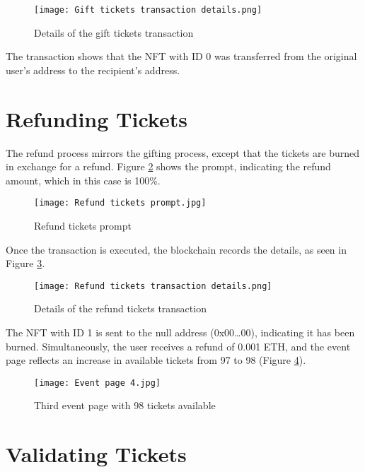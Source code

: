 \begin{figure}[H]
    \texttt{[image: Gift tickets transaction details.png]}
    \centering
    \caption{Details of the gift tickets transaction}
    \label{fig:gift_tickets_transaction_details}
\end{figure}

The transaction shows that the NFT with ID 0 was transferred from the original
user's address to the recipient's address.

\section{Refunding Tickets}
\label{sec:refund_tickets}

The refund process mirrors the gifting process, except that the tickets are
burned in exchange for a refund. Figure \ref{fig:refund_tickets_prompt} shows
the prompt, indicating the refund amount, which in this case is 100\%.

\begin{figure}[H]
    \texttt{[image: Refund tickets prompt.jpg]}
    \centering
    \caption{Refund tickets prompt}
    \label{fig:refund_tickets_prompt}
\end{figure}

Once the transaction is executed, the blockchain records the details, as seen
in Figure \ref{fig:refund_tickets_transaction_details}.

\begin{figure}[H]
    \texttt{[image: Refund tickets transaction details.png]}
    \centering
    \caption{Details of the refund tickets transaction}
    \label{fig:refund_tickets_transaction_details}
\end{figure}

The NFT with ID 1 is sent to the null address (0x00\dots00), indicating it has
been burned. Simultaneously, the user receives a refund of 0.001 ETH, and the
event page reflects an increase in available tickets from 97 to 98 (Figure
\ref{fig:refund_tickets_event}).

\begin{figure}[H]
    \texttt{[image: Event page 4.jpg]}
    \centering
    \caption{Third event page with 98 tickets available}
    \label{fig:refund_tickets_event}
\end{figure}

\section{Validating Tickets}
\label{sec:validate_tickets}

